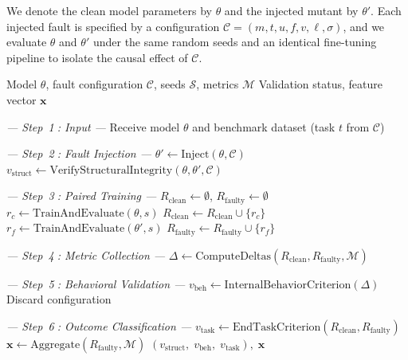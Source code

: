 We denote the clean model parameters by $\theta$ and the injected mutant by $\theta'$. Each injected fault is specified by a configuration $\mathcal{C} = (m, t, u, f, v, \ell, \sigma)$, and we evaluate $\theta$ and $\theta'$ under the same random seeds and an identical fine-tuning pipeline to isolate the causal effect of $\mathcal{C}$.
\begin{algorithm}[!htbp]
\caption{Fault injection and validation pipeline (steps correspond to Figure~\ref{fig:methodology-workflow})}
\label{alg:injection}
\begin{algorithmic}[1]
\Require Model $\theta$, fault configuration $\mathcal{C}$, seeds $\mathcal{S}$, metrics $\mathcal{M}$
\Ensure Validation status, feature vector $\mathbf{x}$

\Statex \hfill\textit{--- Step~\textcircled{\scriptsize 1}: Input ---}
\State Receive model $\theta$ and benchmark dataset (task $t$ from $\mathcal{C}$)

\Statex \hfill\textit{--- Step~\textcircled{\scriptsize 2}: Fault Injection ---}
\State $\theta' \gets \text{Inject}(\theta, \mathcal{C})$ 
\State $v_{\text{struct}} \gets \text{VerifyStructuralIntegrity}(\theta, \theta', \mathcal{C})$ 

\Statex \hfill\textit{--- Step~\textcircled{\scriptsize 3}: Paired Training ---}
\State $R_{\text{clean}} \gets \emptyset$, $R_{\text{faulty}} \gets \emptyset$ 
    \State $r_c \gets \text{TrainAndEvaluate}(\theta, s)$ 
    \State $R_{\text{clean}} \gets R_{\text{clean}} \cup \{r_c\}$
    \State $r_f \gets \text{TrainAndEvaluate}(\theta', s)$ 
    \State $R_{\text{faulty}} \gets R_{\text{faulty}} \cup \{r_f\}$
\EndFor

\Statex \hfill\textit{--- Step~\textcircled{\scriptsize 4}: Metric Collection ---}
\State $\Delta \gets \text{ComputeDeltas}(R_{\text{clean}}, R_{\text{faulty}}, \mathcal{M})$ 

\Statex \hfill\textit{--- Step~\textcircled{\scriptsize 5}: Behavioral Validation ---}
\State $v_{\text{beh}} \gets \text{InternalBehaviorCriterion}(\Delta)$ 
    \State Discard configuration 
\EndIf

\Statex \hfill\textit{--- Step~\textcircled{\scriptsize 6}: Outcome Classification ---}
\State $v_{\text{task}} \gets \text{EndTaskCriterion}(R_{\text{clean}}, R_{\text{faulty}})$ 
\State $\mathbf{x} \gets \text{Aggregate}(R_{\text{faulty}}, \mathcal{M})$
\State \Return $(v_{\text{struct}},\; v_{\text{beh}},\; v_{\text{task}}), \;\mathbf{x}$ 
\end{algorithmic}
\end{algorithm}

